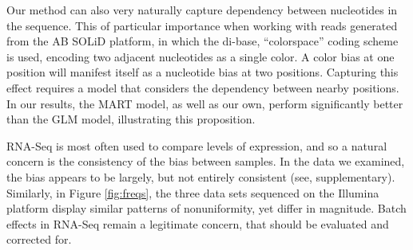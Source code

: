 \documentclass{bioinfo}
\begin{document}
Our method can also very naturally capture dependency between nucleotides in the
sequence. This of particular importance when working with reads generated from
the AB SOLiD platform, in which the di-base, ``colorspace'' coding scheme is
used, encoding two adjacent nucleotides as a single color. A color bias at one
position will manifest itself as a nucleotide bias at two positions. Capturing
this effect requires a model that considers the dependency between nearby
positions. In our results, the MART model, as well as our own, perform
significantly better than the GLM model, illustrating this proposition.

RNA-Seq is most often used to compare levels of expression, and so a natural
concern is the consistency of the bias between samples. In the data we examined,
the bias appears to be largely, but not entirely consistent (see,
supplementary). Similarly, in Figure \ref{fig:freqs}, the three data sets
sequenced on the Illumina platform display similar patterns of nonuniformity,
yet differ in magnitude. Batch effects in RNA-Seq remain a legitimate concern,
that should be evaluated and corrected for.




\end{document}
